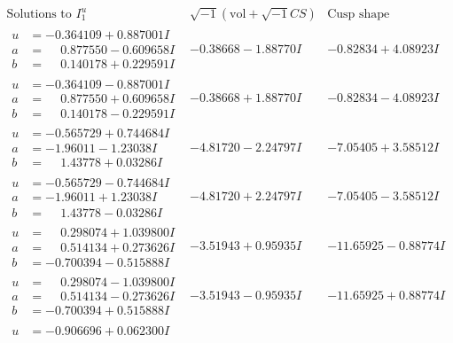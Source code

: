 \documentclass[1p]{elsarticle_modified}
\theoremstyle{definition}
\newcommand{\I}{\sqrt{-1}}
\begin{document}
$$\begin{array}{c|c|c}  
\text{Solutions to }I^u_{1}& \I (\text{vol} + \sqrt{-1}CS) & \text{Cusp shape}\\
 \hline 
\begin{aligned}
u &= -0.364109 + 0.887001 I \\
a &= \phantom{-}0.877550 - 0.609658 I \\
b &= \phantom{-}0.140178 + 0.229591 I\end{aligned}
 & -0.38668 - 1.88770 I & -0.82834 + 4.08923 I \\ \hline\begin{aligned}
u &= -0.364109 - 0.887001 I \\
a &= \phantom{-}0.877550 + 0.609658 I \\
b &= \phantom{-}0.140178 - 0.229591 I\end{aligned}
 & -0.38668 + 1.88770 I & -0.82834 - 4.08923 I \\ \hline\begin{aligned}
u &= -0.565729 + 0.744684 I \\
a &= -1.96011 - 1.23038 I \\
b &= \phantom{-}1.43778 + 0.03286 I\end{aligned}
 & -4.81720 - 2.24797 I & -7.05405 + 3.58512 I \\ \hline\begin{aligned}
u &= -0.565729 - 0.744684 I \\
a &= -1.96011 + 1.23038 I \\
b &= \phantom{-}1.43778 - 0.03286 I\end{aligned}
 & -4.81720 + 2.24797 I & -7.05405 - 3.58512 I \\ \hline\begin{aligned}
u &= \phantom{-}0.298074 + 1.039800 I \\
a &= \phantom{-}0.514134 + 0.273626 I \\
b &= -0.700394 - 0.515888 I\end{aligned}
 & -3.51943 + 0.95935 I & -11.65925 - 0.88774 I \\ \hline\begin{aligned}
u &= \phantom{-}0.298074 - 1.039800 I \\
a &= \phantom{-}0.514134 - 0.273626 I \\
b &= -0.700394 + 0.515888 I\end{aligned}
 & -3.51943 - 0.95935 I & -11.65925 + 0.88774 I \\ \hline\begin{aligned}
u &= -0.906696 + 0.062300 I \\

\end{aligned}
\end{array}$$
\end{document}
